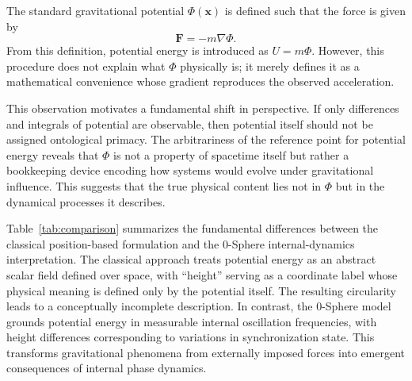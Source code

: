 \documentclass[%
 reprint,
 amsmath,amssymb,
 aps,
 prb,
]{revtex4-2}
\numberwithin{equation}{section}
\begin{document}
The standard gravitational potential $\Phi(\mathbf{x})$ is defined such that the force is given by
\begin{equation}
\mathbf{F} = - m \nabla \Phi.
\label{eq:force_potential}
\end{equation}
From this definition, potential energy is introduced as $U = m \Phi$. However, this procedure does not explain what $\Phi$ physically is; it merely defines it as a mathematical convenience whose gradient reproduces the observed acceleration.

This observation motivates a fundamental shift in perspective. If only differences and integrals of potential are observable, then potential itself should not be assigned ontological primacy. The arbitrariness of the reference point for potential energy reveals that $\Phi$ is not a property of spacetime itself but rather a bookkeeping device encoding how systems would evolve under gravitational influence. This suggests that the true physical content lies not in $\Phi$ but in the dynamical processes it describes.

Table~\ref{tab:comparison} summarizes the fundamental differences between the classical position-based formulation and the 0-Sphere internal-dynamics interpretation. The classical approach treats potential energy as an abstract scalar field defined over space, with ``height'' serving as a coordinate label whose physical meaning is defined only by the potential itself. The resulting circularity leads to a conceptually incomplete description. In contrast, the 0-Sphere model grounds potential energy in measurable internal oscillation frequencies, with height differences corresponding to variations in synchronization state. This transforms gravitational phenomena from externally imposed forces into emergent consequences of internal phase dynamics.
\end{document}
